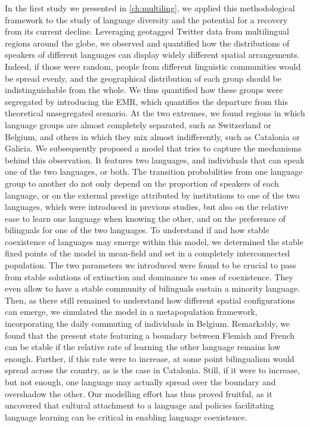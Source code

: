 \documentclass[../thesis.tex]{subfiles}
\begin{document}
In the first study we presented in \cref{ch:multiling}, we applied this methodological
framework to the study of language diversity and the potential for a recovery from its
current decline. Leveraging geotagged Twitter data from multilingual regions around the
globe, we observed and quantified how the distributions of speakers of different
languages can display widely different spatial arrangements. Indeed, if those were
random, people from different linguistic communities would be spread evenly, and the
geographical distribution of each group should be indistinguishable from the whole. We
thus quantified how these groups were segregated by introducing the \ac{EMR}, which
quantifies the departure from this theoretical unsegregated scenario. At the two
extremes, we found regions in which language groups are almost completely separated,
such as Switzerland or Belgium, and others in which they mix almost indifferently, such
as Catalonia or Galicia. We subsequently proposed a model that tries to capture the
mechanisms behind this observation. It features two languages, and individuals that can
speak one of the two languages, or both. The transition probabilities from one language
group to another do not only depend on the proportion of speakers of each language, or
on the external prestige attributed by institutions to one of the two languages, which
were introduced in previous studies, but also on the relative ease to learn one language
when knowing the other, and on the preference of bilinguals for one of the two
languages. To understand if and how stable coexistence of languages may emerge within
this model, we determined the stable fixed points of the model in mean-field and set in
a completely interconnected population. The two parameters we introduced were found to
be crucial to pass from stable solutions of extinction and dominance to ones of
coexistence. They even allow to have a stable community of bilinguals sustain a minority
language. Then, as there still remained to understand how different spatial
configurations can emerge, we simulated the model in a metapopulation framework,
incorporating the daily commuting of individuals in Belgium. Remarkably, we found that
the present state featuring a boundary between Flemish and French can be stable if the
relative rate of learning the other language remains low enough. Further, if this rate
were to increase, at some point bilingualism would spread across the country, as is the
case in Catalonia. Still, if it were to increase, but not enough, one language may
actually spread over the boundary and overshadow the other. Our modelling effort has
thus proved fruitful, as it uncovered that cultural attachment to a language and
policies facilitating language learning can be critical in enabling language
coexistence.
\end{document}
